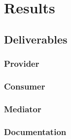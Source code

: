 \chapter{Results}

\section{Deliverables}

\subsection{Provider}

\subsection{Consumer}

\subsection{Mediator}

\subsection{Documentation}
